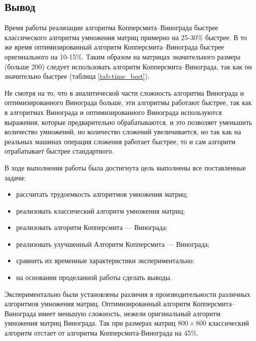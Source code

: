 \subsection{Вывод}

Время работы реализации алгоритма Копперсмита–Винограда быстрее классического алгоритма умножения матриц примерно на 25-30\% быстрее. В то же время оптимизированный алгоритм Копперсмита–Винограда быстрее оригинального на 10-15\%. Таким образом на матрицах значительного размера (больше 200) следует использовать алгоритм Копперсмита–Винограда, так как он значительно быстрее (таблица \ref{tab:time_best}). 

Не смотря на то, что в аналитической части сложность алгоритма Винограда и оптимизированного Винограда больше, эти алгоритмы работают быстрее, так как в алгоритмах Винограда и оптимизированного Винограда используются выражения, которые предварительно обрабатываются, и это позволяет уменьшить количество умножений, но количество сложений увеличивается, но так как на реальных машинах операция сложения работает быстрее, то и сам алгоритм отрабатывает быстрее стандартного.


В ходе выполнения работы была достигнута цель выполнены все поставленные задачи:

\begin{itemize}
    \item рассчитать трудоемкость алгоритмов умножения матриц;
    \item реализовать классический алгоритм умножения матриц;
    \item реализовать алгоритм Копперсмита — Винограда;
    \item реализовать улучшенный Алгоритм Копперсмита — Винограда;
    \item сравнить их временные характеристики экспериментально;
    \item на основании проделанной работы сделать выводы.
\end{itemize}

Экспериментально были установлены различия в производительности различных алгоритмов умножения матриц. Оптимизированный алгоритм Копперсмита–Винограда имеет меньшую сложность, нежели оригинальный алгоритм умножения матриц Винограда. Так при размерах матриц $800 \times 800$ классический алгоритм отстает от алгоритма Копперсмита-Винограда на 45\%.



